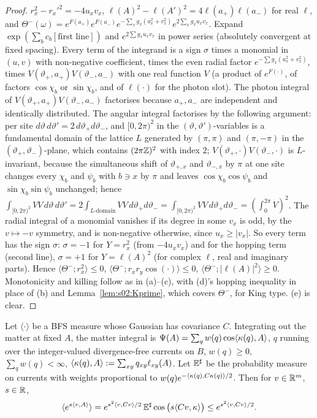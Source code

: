\begin{proof}
$r_x^2-r_x'^2=-4u_xv_x$, $\ell(A)^2-\ell(A')^2=4\ell(a_+)\ell(a_-)$ for real $\ell$, and $\Theta^-(\omega)=e^{F(a_+)}e^{F(a_-)}e^{-\sum_xg_x(u_x^2+v_x^2)}e^{2\sum_xg_xu_xv_x}$. Expand $\exp(\sum_bc_b[\text{first line}])$ and $e^{2\sum g_xu_xv_x}$ in power series (absolutely convergent at fixed spacing). Every term of the integrand is a sign $\sigma$ times a monomial in $(u,v)$ with non-negative coefficient, times the even radial factor $e^{-\sum g_x(u_x^2+v_x^2)}$, times $V(\vartheta_+,a_+)V(\vartheta_-,a_-)$ with one real function $V$ (a product of $e^{F(\cdot)}$, of factors $\cos\chi_b$ or $\sin\chi_b$, and of $\ell(\cdot)$ for the photon slot). The photon integral of $V(\vartheta_+,a_+)V(\vartheta_-,a_-)$ factorises because $a_+,a_-$ are independent and identically distributed. The angular integral factorises by the following argument: per site $d\vartheta\,d\vartheta'=2\,d\vartheta_+d\vartheta_-$, and $[0,2\pi)^2$ in the $(\vartheta,\vartheta')$-variables is a fundamental domain of the lattice $L$ generated by $(\pi,\pi)$ and $(\pi,-\pi)$ in the $(\vartheta_+,\vartheta_-)$-plane, which contains $(2\pi\mathbb Z)^2$ with index $2$; $V(\vartheta_+,\cdot)V(\vartheta_-,\cdot)$ is $L$-invariant, because the simultaneous shift of $\vartheta_{+,x}$ and $\vartheta_{-,x}$ by $\pi$ at one site changes every $\chi_b$ and $\psi_b$ with $b\ni x$ by $\pi$ and leaves $\cos\chi_b\cos\psi_b$ and $\sin\chi_b\sin\psi_b$ unchanged; hence $\int_{[0,2\pi)^2}VV\,d\vartheta\,d\vartheta'=2\int_{L\text{-domain}}VV\,d\vartheta_+d\vartheta_-=\int_{[0,2\pi)^2}VV\,d\vartheta_+d\vartheta_-=(\int_0^{2\pi}V)^2$. The radial integral of a monomial vanishes if its degree in some $v_x$ is odd, by the $v\mapsto-v$ symmetry, and is non-negative otherwise, since $u_x\ge|v_x|$. So every term has the sign $\sigma$: $\sigma=-1$ for $Y=r_x^2$ (from $-4u_xv_x$) and for the hopping term (second line), $\sigma=+1$ for $Y=\ell(A)^2$ (for complex $\ell$, real and imaginary parts). Hence $\langle\Theta^-;r_x^2\rangle\le0$, $\langle\Theta^-;r_xr_y\cos(\cdot)\rangle\le0$, $\langle\Theta^-;|\ell(A)|^2\rangle\ge0$. Monotonicity and killing follow as in (a)--(c), with (d)'s hopping inequality in place of (b) and Lemma~\ref{lem:s02:Kprime}, which covers $\Theta^-$, for King type. (e) is clear.
\end{proof}

\begin{lemma}\label{lem:s02:GD}
Let $\langle\cdot\rangle$ be a BFS measure whose Gaussian has covariance $C$. Integrating out the matter at fixed $A$, the matter integral is $\Psi(A)=\sum_qw(q)\cos\langle \kappa(q),A\rangle$, $q$ running over the integer-valued divergence-free currents on $B$, $w(q)\ge0$, $\sum_qw(q)<\infty$, $\langle \kappa(q),A\rangle:=\sum_{xy}q_{xy}\ell_{xy}(A)$. Let $\mathbb E^\sharp$ be the probability measure on currents with weights proportional to $w(q)e^{-\langle \kappa(q),C\kappa(q)\rangle/2}$. Then for $v\in\mathbb R^m$, $s\in\mathbb R$,
\[
\langle e^{s\langle v,A\rangle}\rangle=e^{s^2\langle v,Cv\rangle/2}\,\mathbb E^\sharp\cos\big(s\langle Cv,\kappa\rangle\big)\le e^{s^2\langle v,Cv\rangle/2}.
\]
\end{lemma}

